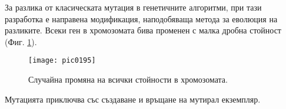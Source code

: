 За разлика от класическата мутация в генетичните алгоритми, при тази разработка е направена модификация, наподобяваща метода за еволюция на разликите. Всеки ген в хромозомата бива променен с малка дробна стойност (Фиг. \ref{fig:pic0195}). 

\begin{figure}[h]
  \centering
  \texttt{[image: pic0195]}
  \caption{Случайна промяна на всички стойности в хромозомата.}
\label{fig:pic0195}
\end{figure}
\FloatBarrier

Мутацията приключва със създаване и връщане на мутирал екземпляр.
